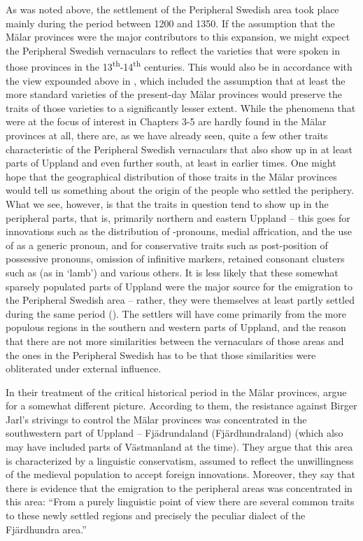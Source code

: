 As was noted above, the settlement of the Peripheral Swedish area took place mainly during the period between 1200 and 1350. If the assumption that the Mälar provinces were the major contributors to this expansion, we might expect the Peripheral Swedish vernaculars to reflect the varieties that were spoken in those provinces in the 13\textsuperscript{th}{}-14\textsuperscript{th} centuries. This would also be in accordance with the view expounded above in , which included the assumption that at least the more standard varieties of the present-day Mälar provinces would preserve the traits of those varieties to a significantly lesser extent. While the phenomena that were at the focus of interest in Chapters 3{}-5 are hardly found in the Mälar provinces at all, there are, as we have already seen, quite a few other traits characteristic of the Peripheral Swedish vernaculars that also show up in at least parts of Uppland and even further south, at least in earlier times. One might hope that the geographical distribution of those traits in the Mälar provinces would tell us something about the origin of the people who settled the periphery. What we see, however, is that the traits in question tend to show up in the peripheral parts, that is, primarily northern and eastern Uppland – this goes for innovations such as the distribution of -pronouns, medial affrication, and the use of  as a generic pronoun, and for conservative traits such as post-position of possessive pronouns, omission of infinitive markers, retained consonant clusters such as (as in ‘lamb’)\textit{ }and various others. It is less likely that these somewhat sparsely populated parts of Uppland were the major source for the emigration to the Peripheral Swedish area – rather, they were themselves at least partly settled during the same period (\citet{Broberg1990}). The settlers will have come primarily from the more populous regions in the southern and western parts of Uppland, and the reason that there are not more similarities between the vernaculars of those areas and the ones in the Peripheral Swedish has to be that those similarities were obliterated under external influence. 

In their treatment of the critical historical period in the Mälar provinces, \citet{LindströmEtAl2006} argue for a somewhat different picture. According to them, the resistance against Birger Jarl’s strivings to control the Mälar provinces was concentrated in the southwestern part of Uppland – Fjädrundaland (Fjärdhundraland) (which also may have included parts of Västmanland at the time). They argue that this area is characterized by a linguistic conservatism, assumed to reflect the unwillingness of the medieval population to accept foreign innovations. Moreover, they say that there is evidence that the emigration to the peripheral areas was concentrated in this area: “From a purely linguistic point of view there are several common traits to these newly settled regions and precisely the peculiar dialect of the Fjärdhundra area.”

